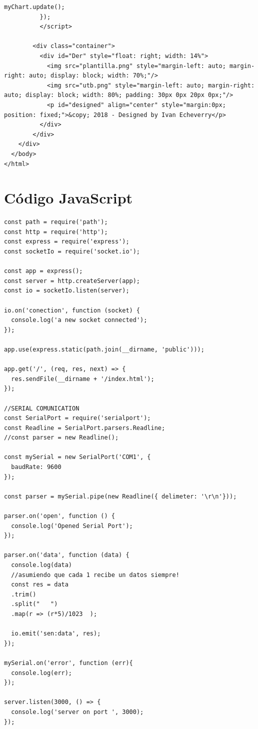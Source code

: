 \begin{lstlisting}[style=HTML5]
            myChart.update();
          });
          </script>
          
        <div class="container">
          <div id="Der" style="float: right; width: 14%">
            <img src="plantilla.png" style="margin-left: auto; margin-right: auto; display: block; width: 70%;"/>
            <img src="utb.png" style="margin-left: auto; margin-right: auto; display: block; width: 80%; padding: 30px 0px 20px 0px;"/>
            <p id="designed" align="center" style="margin:0px; position: fixed;">&copy; 2018 - Designed by Ivan Echeverry</p>
          </div>
        </div>
    </div>
  </body>
</html>
\end{lstlisting}

\section{Código JavaScript}
\begin{lstlisting}[style=HTML5]
const path = require('path');
const http = require('http');
const express = require('express');
const socketIo = require('socket.io');

const app = express();
const server = http.createServer(app);
const io = socketIo.listen(server);

io.on('conection', function (socket) {
  console.log('a new socket connected');
});

app.use(express.static(path.join(__dirname, 'public')));

app.get('/', (req, res, next) => {
  res.sendFile(__dirname + '/index.html');
});

//SERIAL COMUNICATION
const SerialPort = require('serialport');
const Readline = SerialPort.parsers.Readline;
//const parser = new Readline();

const mySerial = new SerialPort('COM1', {
  baudRate: 9600
});

const parser = mySerial.pipe(new Readline({ delimeter: '\r\n'}));

parser.on('open', function () {
  console.log('Opened Serial Port');
});

parser.on('data', function (data) {
  console.log(data)
  //asumiendo que cada 1 recibe un datos siempre!
  const res = data
  .trim()
  .split("   ")
  .map(r => (r*5)/1023  );

  io.emit('sen:data', res);
});

mySerial.on('error', function (err){
  console.log(err);
});

server.listen(3000, () => {
  console.log('server on port ', 3000);
});
\end{lstlisting}

